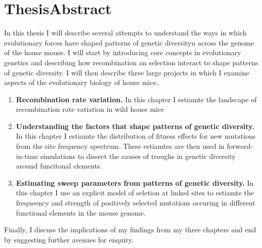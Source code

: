 
\chapter*{ThesisAbstract}

In this thesis I will describe several attempts to understand the ways in which evolutionary forces have shaped patterns of genetic diversityu across the genome of the house mouse. I will start by introducing core concepts in evolutionary genetics and describing how recombination an selection interact to shape patterns of genetic diversity. I will then describe three large projects in which I examine aspects of the evolutionary biology of house mice.
\begin{enumerate}
	\item \textbf{Recombination rate variation.} In this chapter I estiamte the landscape of recombination rate vatiation in wild house mice
	\item \textbf{Understanding the factors that shape patterns of genetic diversity.} In this chapter I estiamte the distribution of fitness effects for new mutations from the site frequency spectrum. These estiamtes are then used in forward-in-time simulations to dissect the causes of troughs in genetic diversity around funcitonal elements.
	\item \textbf{Estimating sweep parameters from patterns of genetic diversity.} In this chapter I use an explicit model of seletion at linked sites to estiamte the frequeency and strength of positively selected mutations occuring in different functional elements in the mouse genome.
\end{enumerate}

Finally, I discuss the implications of my findings from my three chapters and end by suggesting further avenues for enquiry.